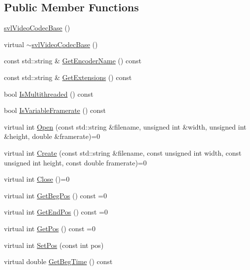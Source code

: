 \subsection*{Public Member Functions}
\begin{DoxyCompactItemize}
\item 
\hyperlink{classsvl_video_codec_base_a3945c8c1e62bf8e1de6500592963627c}{svl\-Video\-Codec\-Base} ()
\item 
virtual \hyperlink{classsvl_video_codec_base_a94ba1a1a76beeaddb5f9617aac89e482}{$\sim$svl\-Video\-Codec\-Base} ()
\item 
const std\-::string \& \hyperlink{classsvl_video_codec_base_afff04477c71dbc08410c8dcc4bcec8dd}{Get\-Encoder\-Name} () const 
\item 
const std\-::string \& \hyperlink{classsvl_video_codec_base_a536465ea89b94df203b6125a9a04f754}{Get\-Extensions} () const 
\item 
bool \hyperlink{classsvl_video_codec_base_abbbfcea9dd4009f734b279b1546e0835}{Is\-Multithreaded} () const 
\item 
bool \hyperlink{classsvl_video_codec_base_ab8e4b7ef187db972741336d055ee697c}{Is\-Variable\-Framerate} () const 
\item 
virtual int \hyperlink{classsvl_video_codec_base_a478f865232f8c6fa67fcfdb0b92c6991}{Open} (const std\-::string \&filename, unsigned int \&width, unsigned int \&height, double \&framerate)=0
\item 
virtual int \hyperlink{classsvl_video_codec_base_a388195458d91ca407c01e42d1a54fd7c}{Create} (const std\-::string \&filename, const unsigned int width, const unsigned int height, const double framerate)=0
\item 
virtual int \hyperlink{classsvl_video_codec_base_a06119b490cb63be4f123c33abb696843}{Close} ()=0
\item 
virtual int \hyperlink{classsvl_video_codec_base_a88437c6468abbf0631c4cfa4a18c9231}{Get\-Beg\-Pos} () const =0
\item 
virtual int \hyperlink{classsvl_video_codec_base_a9d41fc01ce87a9a0fb871cd869a581c8}{Get\-End\-Pos} () const =0
\item 
virtual int \hyperlink{classsvl_video_codec_base_a6e74b3fb8404c8f2a0b31c164d19cbfa}{Get\-Pos} () const =0
\item 
virtual int \hyperlink{classsvl_video_codec_base_a57123281dfbc3374d4a7fca5bc85cf45}{Set\-Pos} (const int pos)
\item 
virtual double \hyperlink{classsvl_video_codec_base_a5b709baf483a616d49a9f33ffe7f970b}{Get\-Beg\-Time} () const 

\end{DoxyCompactItemize}
